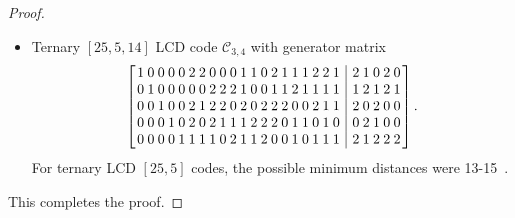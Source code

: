 \documentclass{article}
\theoremstyle{definition}
\theoremstyle{remark}
\begin{document}
\begin{proof}
\begin{itemize}
\[    \begin{array}{cccccccccccccccccccc|cccc}
    1&0&0&0&0&2&2&1&1&0&0&2&0&2&1&1&2&2&2&0~&~0&0&0&1\\
    0&1&0&2&0&1&0&0&2&0&2&1&1&0&2&1&2&1&0&2~&~2&2&2&1\\
    0&0&1&2&0&0&1&2&2&2&0&2&1&0&2&0&2&0&1&1~&~1&0&2&0\\
    0&0&0&0&1&1&1&1&2&2&2&2&1&1&1&1&0&0&0&0~&~0&1&1&1\\
    \hline
    0&0&0&1&0&2&0&1&1&1&0&0&2&1&0&2&0&0&1&1~&~0&1&0&2\\
    0&0&0&0&0&0&1&2&1&1&0&1&1&1&0&1&2&2&0&2~&~1&1&0&2
    \end{array}
    \right].
    \]
        For ternary LCD $[24, 6]$ codes, the possible minimum distances were 11-13~\cite{Li-optimal-LCD-2024-1}.
      \smallskip
    \item Ternary $[25, 5, 14]$ LCD code $\mathcal C_{3,4}$ with generator matrix
    \[
    \setlength{\arraycolsep}{1.2pt}
    \left[
    \begin{array}{cccccccccccccccccccc|ccccc}
    1&0&0&0&0&2&2&0&0&0&1&1&0&2&1&1&1&2&2&1~&~2&1&0&2&0\\
    0&1&0&0&0&0&0&2&2&2&1&0&0&1&1&2&1&1&1&1~&~1&2&1&2&1\\
    0&0&1&0&0&2&1&2&2&0&2&0&2&2&2&0&0&2&1&1~&~2&0&2&0&0\\
    0&0&0&1&0&2&0&2&1&1&1&2&2&2&0&1&1&0&1&0~&~0&2&1&0&0\\
    0&0&0&0&1&1&1&1&0&2&1&1&2&0&0&1&0&1&1&1~&~2&1&2&2&2
    \end{array}
    \right].
    \]
          For ternary LCD $[25, 5]$ codes, the possible minimum distances were 13-15~\cite{Li-optimal-LCD-2024-1}.
\end{itemize}
This completes the proof.
\end{proof}
\end{document}
